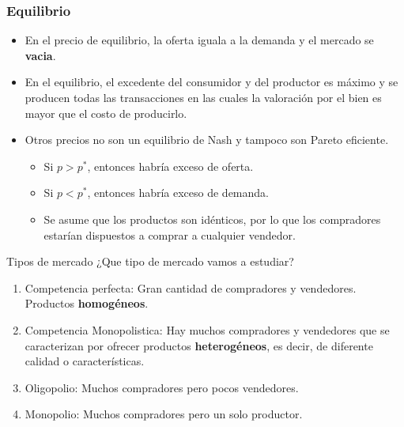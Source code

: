 \documentclass{beamer}
\begin{document}
\begin{frame}
\frametitle{Equilibrio}
\begin{itemize}
    \item En el precio de equilibrio, la oferta iguala a la demanda y el mercado se \textbf{vacia}.
    \item En el equilibrio, el excedente del consumidor y del productor es máximo y se producen todas las transacciones en las cuales la valoración por el bien es mayor que el costo de producirlo.
    \item Otros precios no son un equilibrio de Nash y tampoco son Pareto eficiente.
    \begin{itemize}
        \item Si $p > p^{*}$, entonces habría exceso de oferta.
        \item Si $p < p^{*}$, entonces habría exceso de demanda.
        \item Se asume que los productos son idénticos, por lo que los compradores estarían dispuestos a comprar a cualquier vendedor.
    \end{itemize}
\end{itemize}
\end{frame}

\begin{frame}{Tipos de mercado}
    ¿Que tipo de mercado vamos a estudiar?
    \begin{enumerate}
        \item Competencia perfecta: Gran cantidad de compradores y vendedores. Productos \textbf{homogéneos}.
        \item Competencia Monopolistica: Hay muchos compradores
        y vendedores que se caracterizan por ofrecer productos \textbf{heterogéneos}, es decir, de diferente
        calidad o características.
        \item Oligopolio: Muchos compradores pero pocos vendedores.
        \item Monopolio: Muchos compradores pero un solo productor.
    \end{enumerate}
\end{frame}
\end{document}

